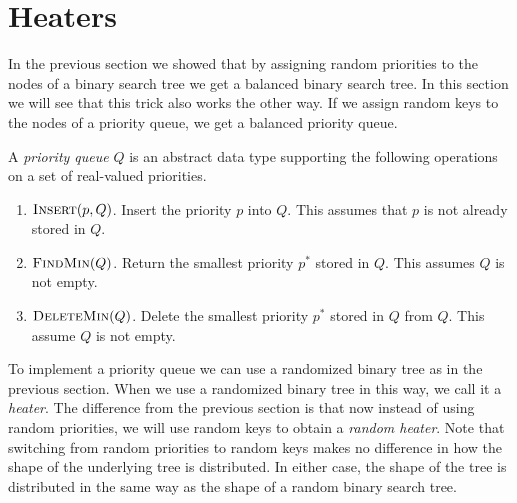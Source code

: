 %
%
%




\section{Heaters}

In the previous section we showed that by assigning random priorities
to the nodes of a binary search tree we get a balanced binary search
tree.  In this section we will see that this trick also works the
other way.  If we assign random keys to the nodes of a priority queue,
we get a balanced priority queue.

A \emph{priority queue} $Q$ is an abstract data type supporting the
following operations on a set of real-valued priorities.

\begin{enumerate}
\item $\textsc{Insert}(p, Q)$. Insert the priority $p$ into $Q$.  This
assumes that $p$ is not already stored in $Q$.

\item $\textsc{FindMin}(Q)$. Return the smallest priority $p^*$ stored
in $Q$.  This assumes $Q$ is not empty.

\item $\textsc{DeleteMin}(Q)$. Delete the smallest priority $p^*$
stored in $Q$ from $Q$.  This assume $Q$ is not empty.
\end{enumerate}

To implement a priority queue we can use a randomized binary tree as
in the previous section.  When we use a randomized binary tree in this
way, we call it a \emph{heater}. The difference from the previous
section is that now instead of using random priorities, we will use
random keys to obtain a \emph{random heater}.  Note that switching
from random priorities to random keys makes no difference in how the
shape of the underlying tree is distributed.  In either case, the
shape of the tree is distributed in the same way as the shape of a
random binary search tree.

